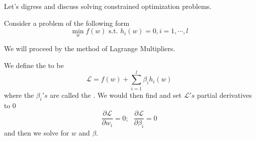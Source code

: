 \documentclass[12pt]{scrartcl}
\begin{document}
Let's digress and discuss solving constrained optimization problems.
\begin{example}
    Consider a problem of the following form
    \[\min_w f(w) \text{ s.t. } h_i(w) = 0, i = 1, \cdots, l\]

    We will proceed by the method of Lagrange Multipliers.
    \begin{definition}
        We define the  to be
        \[\mathcal{L} = f(w) + \sum_{i=1}^l \beta_ih_i(w)\]
        where the $\beta_i's$ are called the . We would
        then find and set $\mathcal{L}'s$ partial derivatives to 0
        \[\frac{\partial \mathcal{L}}{\partial w_i } = 0; \ \ \ \frac{\partial \mathcal{L}}{\partial \beta_i} = 0\]
        and then we solve for $w$ and $\beta$.
    \end{definition}
\end{example}
\end{document}
